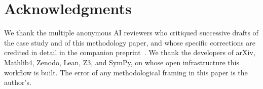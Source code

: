 \documentclass[11pt]{article}
\theoremstyle{definition}
\theoremstyle{remark}
\begin{document}
\section*{Acknowledgments}

We thank the multiple anonymous AI reviewers who critiqued successive
drafts of the case study and of this methodology paper, and whose
specific corrections are credited in detail in the companion
preprint~\cite{Vera2026Conjecture}. We thank the developers of arXiv,
Mathlib4, Zenodo, Lean, Z3, and SymPy, on whose open infrastructure
this workflow is built. The error of any methodological framing in
this paper is the author's.



\end{document}
